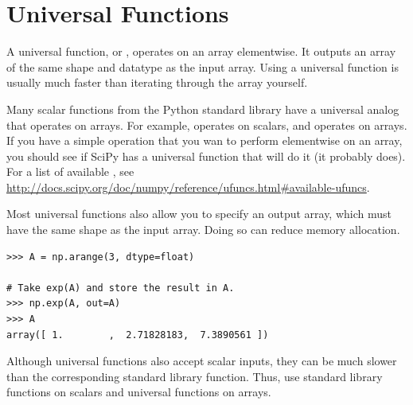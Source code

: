 \section*{Universal Functions}

A universal function, or , operates on an array elementwise. It outputs an array of the same shape and datatype as the input array. Using a universal function is usually much faster than iterating through the array yourself.

Many scalar functions from the Python standard library have a universal analog that operates on arrays. For example,  operates on scalars, and  operates on arrays. If you have a simple operation that you wan to perform elementwise on an array, you should see if SciPy has a universal function that will do it (it probably does). For a list of available , see \url{http://docs.scipy.org/doc/numpy/reference/ufuncs.html#available-ufuncs}.

Most universal functions also allow you to specify an output array, which must have the same shape as the input array.
Doing so can reduce memory allocation. 

\begin{lstlisting}
>>> A = np.arange(3, dtype=float)

# Take exp(A) and store the result in A.
>>> np.exp(A, out=A) 
>>> A
array([ 1.        ,  2.71828183,  7.3890561 ])
\end{lstlisting}

Although universal functions also accept scalar inputs, they can be much slower than the corresponding standard library function. Thus, use standard library functions on scalars and universal functions on arrays.

